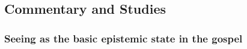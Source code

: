		
	
	
	
	
\subsection{Commentary and Studies} %
	\label{SEE-COMMENTARY}

	
		
	\subsubsection{Seeing as the basic epistemic state in the gospel}
		\label{SEE-epistemic}
		
